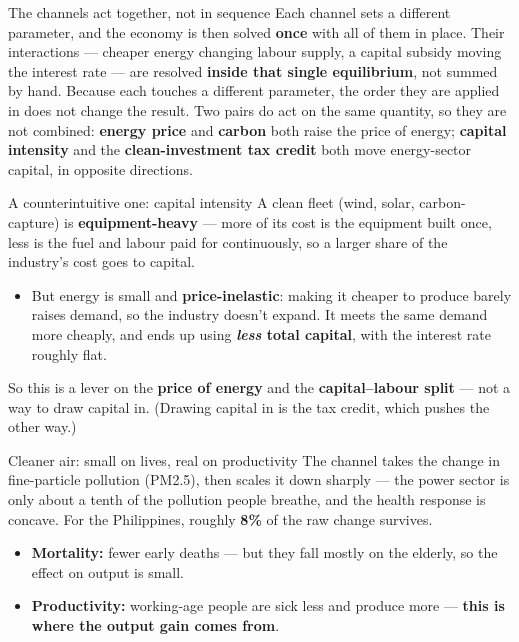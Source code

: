 \documentclass[aspectratio=169,11pt]{beamer}
\begin{document}
\begin{frame}{The channels act together, not in sequence}
  Each channel sets a different parameter, and the economy is then solved \textbf{once} with all of them
  in place. Their interactions — cheaper energy changing labour supply, a capital subsidy moving the
  interest rate — are resolved \textbf{inside that single equilibrium}, not summed by hand. Because each
  touches a different parameter, the order they are applied in does not change the result.
  \vfill
  {\footnotesize\color{sub}Two pairs do act on the same quantity, so they are not combined:
   \textbf{energy price} and \textbf{carbon} both raise the price of energy; \textbf{capital intensity}
   and the \textbf{clean-investment tax credit} both move energy-sector capital, in opposite directions.}
\end{frame}

\begin{frame}{A counterintuitive one: capital intensity}
  A clean fleet (wind, solar, carbon-capture) is \textbf{equipment-heavy} — more of its cost is the
  equipment built once, less is the fuel and labour paid for continuously, so a larger share of the
  industry's cost goes to capital.
  \medskip
  \begin{itemize}\setlength\itemsep{6pt}
    \item But energy is small and \textbf{price-inelastic}: making it cheaper to produce barely raises
          demand, so the industry doesn't expand. It meets the same demand more cheaply, and ends up
          using \textbf{\color{loss}\emph{less} total capital}, with the interest rate roughly flat.
  \end{itemize}
  \medskip
  {\color{sub}So this is a lever on the \textbf{price of energy} and the \textbf{capital--labour split} —
   not a way to draw capital in. (Drawing capital in is the tax credit, which pushes the other way.)}
\end{frame}

\begin{frame}{Cleaner air: small on lives, real on productivity}
  The channel takes the change in fine-particle pollution (PM2.5), then scales it down sharply — the
  power sector is only about a tenth of the pollution people breathe, and the health response is
  concave. For the Philippines, roughly \textbf{8\%} of the raw change survives.
  \medskip
  \begin{itemize}\setlength\itemsep{6pt}
    \item \textbf{Mortality:} fewer early deaths — but they fall mostly on the elderly, so the effect on
          output is small.
    \item \textbf{Productivity:} working-age people are sick less and produce more — \textbf{this is where
          the output gain comes from}.
  \end{itemize}
\end{frame}
\end{document}
